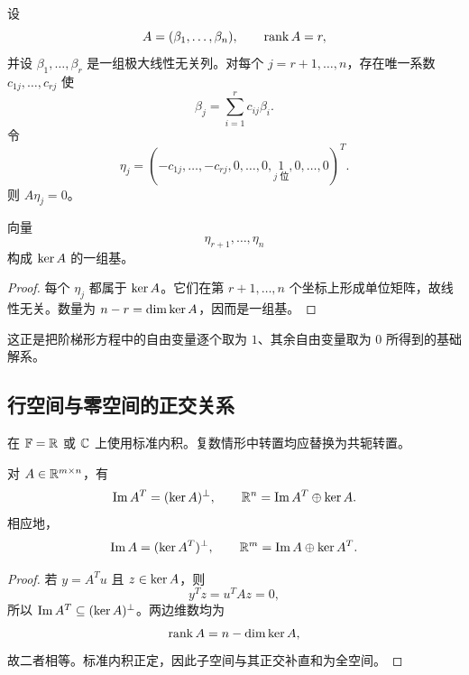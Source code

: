设
\begin{equation}
 A=(\beta_1,\ldots,\beta_n),
 \qquad
 \operatorname{rank} A=r,
\end{equation}
并设 $\beta_1,\ldots,\beta_r$ 是一组极大线性无关列。对每个 $j=r+1,\ldots,n$，存在唯一系数 $c_{1j},\ldots,c_{rj}$ 使
\begin{equation}
 \beta_j=\sum_{i=1}^r c_{ij}\beta_i.
\end{equation}
令
\begin{equation}
 \eta_j=(-c_{1j},\ldots,-c_{rj},0,\ldots,0,
 \underset{j\text{ 位}}{1},0,\ldots,0)^T.
\end{equation}
则 $A\eta_j=0$。

\begin{proposition}
向量
\begin{equation}
 \eta_{r+1},\ldots,\eta_n
\end{equation}
构成 $\operatorname{ker} A$ 的一组基。
\end{proposition}

\begin{proof}
每个 $\eta_j$ 都属于 $\operatorname{ker} A$。它们在第 $r+1,\ldots,n$ 个坐标上形成单位矩阵，故线性无关。数量为 $n-r=\dim\operatorname{ker} A$，因而是一组基。
\end{proof}

\begin{remark}
这正是把阶梯形方程中的自由变量逐个取为 $1$、其余自由变量取为 $0$ 所得到的基础解系。
\end{remark}

\subsection{行空间与零空间的正交关系}

在 $\mathbb F=\mathbb R$ 或 $\mathbb C$ 上使用标准内积。复数情形中转置均应替换为共轭转置。

\begin{theorem}[基本正交分解]
对 $A\in\mathbb R^{m\times n}$，有
\begin{equation}
 \operatorname{Im} A^T=(\operatorname{ker} A)^\perp,
 \qquad
 \mathbb R^n=\operatorname{Im} A^T\oplus\operatorname{ker} A.
\end{equation}
相应地，
\begin{equation}
 \operatorname{Im} A=(\operatorname{ker} A^T)^\perp,
 \qquad
 \mathbb R^m=\operatorname{Im} A\oplus\operatorname{ker} A^T.
\end{equation}
\end{theorem}

\begin{proof}
若 $y=A^Tu$ 且 $z\in\operatorname{ker} A$，则
\begin{equation}
 y^Tz=u^TAz=0,
\end{equation}
所以 $\operatorname{Im} A^T\subseteq(\operatorname{ker} A)^\perp$。两边维数均为
\begin{equation}
 \operatorname{rank} A=n-\dim\operatorname{ker} A,
\end{equation}
故二者相等。标准内积正定，因此子空间与其正交补直和为全空间。
\end{proof}

